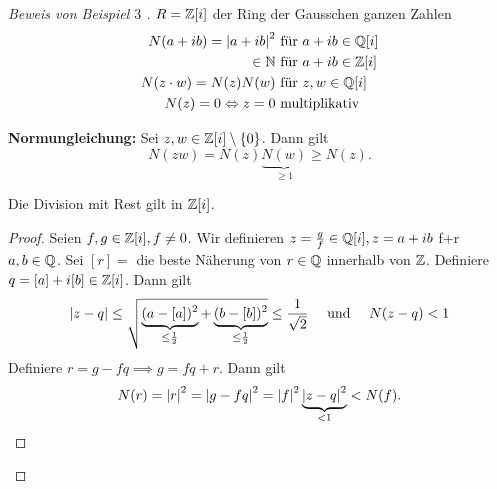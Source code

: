 \begin{proof}[Beweis von Beispiel $3$ ]
	$R = \mathbb{Z}[i]$ der Ring der Gausschen ganzen Zahlen
	\begin{align*}
		N(a+ib) = \abs{a+ib}^2 &\text{ für } a + ib \in \mathbb{Q}[i] \\
		\in \mathbb{N} &\text{ für } a+ib \in \mathbb{Z}[i]\\
		N(z\cdot w) = N(z) N(w) &\text{ für } z,w \in \mathbb{Q}[i]\\
		N(z) = 0  \Leftrightarrow z = 0 &\text{ multiplikativ} 
	\end{align*}

	\textbf{Normungleichung:} Sei $z,w \in \mathbb{Z}[i] \setminus \{0\}$. Dann gilt
	\[
		N(zw) = N(z) \underbrace{N(w)}_{\geq 1} \geq N(z)
	.\] 
	\begin{lemma}
		Die Division mit Rest gilt in $\mathbb{Z}[i]$.
	\end{lemma}
	\begin{proof}
		Seien $f,g \in \mathbb{Z}[i], f \neq 0$. Wir definieren $z = \frac{g}{f} \in \mathbb{Q}[i], z = a+ib$ f+r $a,b \in \mathbb{Q}$.
		Sei $[r] = $ die beste Näherung von $r \in \mathbb{Q}$ innerhalb von $\mathbb{Z}$.
		Definiere $q = [a] + i[b] \in \mathbb{Z}[i]$. Dann gilt 
		\begin{align*}
			\abs{z-q} \leq \sqrt{\underbrace{(a- [a])^2}_{\leq \frac{1}{2}} + \underbrace{(b-[b])^2}_{\leq \frac{1}{2}}} \leq \frac{1}{\sqrt{2}} \qq{ und }
			N(z-q) < 1
		\end{align*}
		Definiere $r = g - f q \implies g = fq + r$. Dann gilt
		\begin{align*}
			N(r) = \abs{r}^2 = \abs{g-fq}^2 = \abs{f}^2 \underbrace{\abs{z-q}^2}_{< 1} < N(f)
		.\end{align*}
	\end{proof}
\end{proof}

